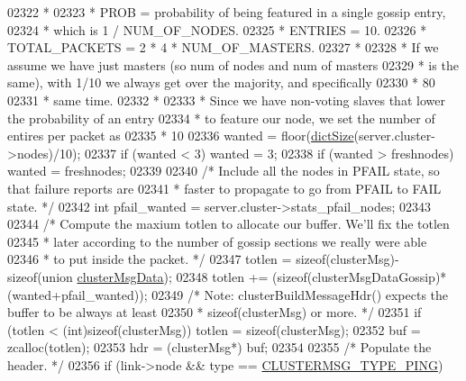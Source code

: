 \begin{DoxyCode}
{{{{{{{{{{{{{{{{{{{{{{{{{{{{{{{{{{{{{{02322 \textcolor{comment}{     *}
02323 \textcolor{comment}{     * PROB = probability of being featured in a single gossip entry,}
02324 \textcolor{comment}{     *        which is 1 / NUM\_OF\_NODES.}
02325 \textcolor{comment}{     * ENTRIES = 10.}
02326 \textcolor{comment}{     * TOTAL\_PACKETS = 2 * 4 * NUM\_OF\_MASTERS.}
02327 \textcolor{comment}{     *}
02328 \textcolor{comment}{     * If we assume we have just masters (so num of nodes and num of masters}
02329 \textcolor{comment}{     * is the same), with 1/10 we always get over the majority, and specifically}
02330 \textcolor{comment}{     * 80%
02331 \textcolor{comment}{     * same time.}
02332 \textcolor{comment}{     *}
02333 \textcolor{comment}{     * Since we have non-voting slaves that lower the probability of an entry}
02334 \textcolor{comment}{     * to feature our node, we set the number of entires per packet as}
02335 \textcolor{comment}{     * 10%
02336     wanted = floor(\hyperlink{dict_8h_af193430dd3d5579a52b194512f72c1f0}{dictSize}(server.cluster->nodes)/10);
02337     \textcolor{keywordflow}{if} (wanted < 3) wanted = 3;
02338     \textcolor{keywordflow}{if} (wanted > freshnodes) wanted = freshnodes;
02339 
02340     \textcolor{comment}{/* Include all the nodes in PFAIL state, so that failure reports are}
02341 \textcolor{comment}{     * faster to propagate to go from PFAIL to FAIL state. */}
02342     \textcolor{keywordtype}{int} pfail\_wanted = server.cluster->stats\_pfail\_nodes;
02343 
02344     \textcolor{comment}{/* Compute the maxium totlen to allocate our buffer. We'll fix the totlen}
02345 \textcolor{comment}{     * later according to the number of gossip sections we really were able}
02346 \textcolor{comment}{     * to put inside the packet. */}
02347     totlen = \textcolor{keyword}{sizeof}(clusterMsg)-\textcolor{keyword}{sizeof}(\textcolor{keyword}{union} \hyperlink{unionclusterMsgData}{clusterMsgData});
02348     totlen += (\textcolor{keyword}{sizeof}(clusterMsgDataGossip)*(wanted+pfail\_wanted));
02349     \textcolor{comment}{/* Note: clusterBuildMessageHdr() expects the buffer to be always at least}
02350 \textcolor{comment}{     * sizeof(clusterMsg) or more. */}
02351     \textcolor{keywordflow}{if} (totlen < (\textcolor{keywordtype}{int})\textcolor{keyword}{sizeof}(clusterMsg)) totlen = \textcolor{keyword}{sizeof}(clusterMsg);
02352     buf = zcalloc(totlen);
02353     hdr = (clusterMsg*) buf;
02354 
02355     \textcolor{comment}{/* Populate the header. */}
02356     \textcolor{keywordflow}{if} (link->node && type == \hyperlink{cluster_8h_aeb8a936505e22f64e5039523a3c96d4c}{CLUSTERMSG\_TYPE\_PING})
}}}}}}}}}}}}}}}}}}}}}}}}}}}}}}}}}}}}}}}}
\end{DoxyCode}
